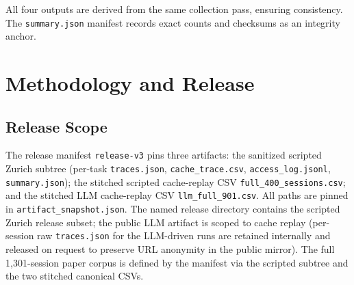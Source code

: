 \documentclass[10pt,sigconf,letterpaper,anonymous,nonacm]{acmart}
\newcommand{\release}{\texttt{release-v3}\xspace}
\begin{document}
All four outputs are derived from the same collection pass, ensuring
consistency.  The \texttt{summary.json} manifest records exact counts
and checksums as an integrity anchor.

\section{Methodology and Release}
\label{sec:methodology}

\subsection{Release Scope}

The release manifest \release pins three artifacts: the sanitized
scripted Zurich subtree (per-task \texttt{traces.json},
\texttt{cache\_trace.csv}, \texttt{access\_log.jsonl},
\texttt{summary.json}); the stitched scripted cache-replay CSV
\texttt{full\_400\_sessions.csv}; and the stitched LLM cache-replay
CSV \texttt{llm\_full\_901.csv}.  All paths are pinned in
\texttt{artifact\_snapshot.json}.  The named release directory
contains the scripted Zurich release subset; the public LLM artifact
is scoped to cache replay (per-session raw \texttt{traces.json} for
the LLM-driven runs are retained internally and released on request
to preserve URL anonymity in the public mirror).
The full 1{,}301-session paper corpus is defined by the manifest via
the scripted subtree and the two stitched canonical CSVs.
\end{document}
